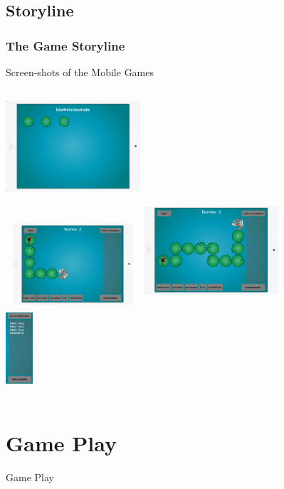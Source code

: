 \documentclass[aspectratio=169]{beamer}
\begin{document}
\subsection{Storyline}
\begin{frame}
\frametitle{The Game Storyline}
Screen-shots of the Mobile Games
\begin{columns}[t]
\centering
\includegraphics[width=5cm,height=3.5cm]{p2.png}\\
\includegraphics[width=5cm,height=3cm]{p3.png}
\centering
\includegraphics[width=5cm,height=4cm]{p4.png}\\
\includegraphics[width=1cm,height=3cm]{p5.png}\\
\end{columns}
\end{frame}

\section{Game Play}
\begin{frame}{Game Play}

\end{frame}
\end{document}
